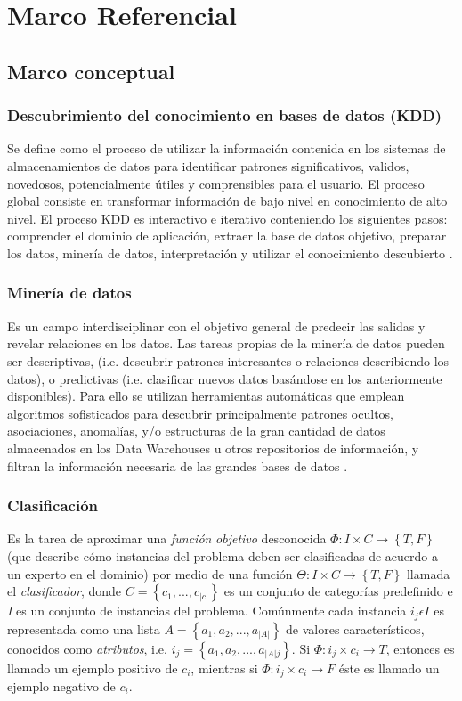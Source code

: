 \chapter{Marco Referencial}
\section{Marco conceptual}
\subsection{Descubrimiento del conocimiento en bases de datos (KDD)}
Se define como el proceso de utilizar la información contenida en los sistemas de almacenamientos de datos para identificar patrones significativos, validos, novedosos, potencialmente útiles y comprensibles para el usuario. El proceso global consiste en transformar información de bajo nivel en conocimiento de alto nivel. El proceso KDD es interactivo e iterativo conteniendo los siguientes pasos: comprender el dominio de aplicación, extraer la base de datos objetivo, preparar los datos, minería de datos, interpretación y utilizar el conocimiento descubierto \cite{key-60}.
\subsection{Minería de datos}
Es un campo interdisciplinar con el objetivo general de predecir las salidas y revelar relaciones en los datos. Las tareas propias de la minería de datos pueden ser descriptivas, (i.e. descubrir patrones interesantes o relaciones describiendo los datos), o predictivas (i.e. clasificar nuevos datos basándose en los anteriormente disponibles). Para ello se utilizan herramientas automáticas que emplean algoritmos sofisticados para descubrir principalmente patrones ocultos, asociaciones, anomalías, y/o estructuras de la gran cantidad de datos almacenados en los Data Warehouses u otros repositorios de información, y filtran la información necesaria de las grandes bases de datos \cite{key-60}.
\subsection{Clasificación}
Es la tarea de aproximar una \emph{función}
\emph{objetivo }desconocida $\Phi:I\times C\rightarrow\left\{ T,F\right\} $
(que describe cómo instancias del problema deben ser clasificadas
de acuerdo a un experto en el dominio) por medio de una función $\Theta:I\times C\rightarrow\left\{ T,F\right\} $
llamada el \emph{clasificador}, donde $C=\left\{ c_{1},...,c_{|c|}\right\} $
es un conjunto de categorías predefinido e \emph{I} es un conjunto
de instancias del problema. Comúnmente cada instancia $i_{j}\epsilon I$
es representada como una lista $A=\left\{ a_{1},a_{2},...,a_{|A|}\right\} $
de valores característicos, conocidos como \emph{atributos}, i.e.
$i_{j}=\left\{ a_{1},a_{2},...,a_{|A|j}\right\} $. Si $\Phi:i_{j}\times c_{i}\rightarrow T$,
entonces es llamado un ejemplo positivo de $c_{i}$, mientras si $\Phi:i_{j}\times c_{i}\rightarrow F$
éste es llamado un ejemplo negativo de $c_{i}$.

